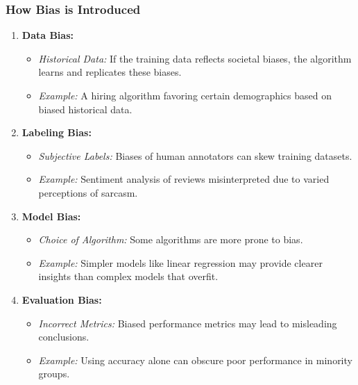 \documentclass[aspectratio=169]{beamer}
\begin{document}
\begin{frame}[fragile]
    \frametitle{How Bias is Introduced}
    \begin{enumerate}
        \item \textbf{Data Bias:}
            \begin{itemize}
                \item \textit{Historical Data:} If the training data reflects societal biases, the algorithm learns and replicates these biases.
                \item \textit{Example:} A hiring algorithm favoring certain demographics based on biased historical data.
            \end{itemize}
        
        \item \textbf{Labeling Bias:}
            \begin{itemize}
                \item \textit{Subjective Labels:} Biases of human annotators can skew training datasets.
                \item \textit{Example:} Sentiment analysis of reviews misinterpreted due to varied perceptions of sarcasm.
            \end{itemize}
        
        \item \textbf{Model Bias:}
            \begin{itemize}
                \item \textit{Choice of Algorithm:} Some algorithms are more prone to bias.
                \item \textit{Example:} Simpler models like linear regression may provide clearer insights than complex models that overfit.
            \end{itemize}
        
        \item \textbf{Evaluation Bias:}
            \begin{itemize}
                \item \textit{Incorrect Metrics:} Biased performance metrics may lead to misleading conclusions.
                \item \textit{Example:} Using accuracy alone can obscure poor performance in minority groups.
            \end{itemize}
    \end{enumerate}
    
\end{frame}
\end{document}
